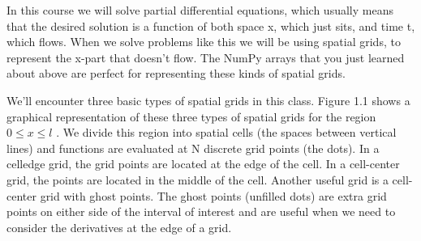 \documentclass{book}
\theoremstyle{plain}
\theoremstyle{definition}
\numberwithin{exm}{chapter}
\theoremstyle{remark}
\theoremstyle{summary}
\theoremstyle{overview}
\begin{document}
    In this course we will solve partial differential equations, which usually means that the desired solution is a function of both space x, which just sits, and time t, which flows. When we solve problems like this we will be using spatial grids, to represent the x-part that doesn\rq t flow. The NumPy arrays that you just learned about above are perfect for representing these kinds of spatial grids. 
    
    We\rq ll encounter three basic types of spatial grids in this class. Figure 1.1 shows a graphical representation of these three types of spatial grids for the region 
    \begin{math}0\leqslant x \leqslant l \end{math} . We divide this region into spatial cells (the spaces between vertical lines) and functions are evaluated at N discrete grid points (the dots). In a celledge grid, the grid points are located at the edge of the cell. In a cell-center grid, the points are located in the middle of the cell. Another useful grid is a cell-center grid with ghost points. The ghost points (unfilled dots) are extra grid points on either side of the interval of interest and are useful when we need to consider the derivatives at the edge of a grid.
\end{document}
